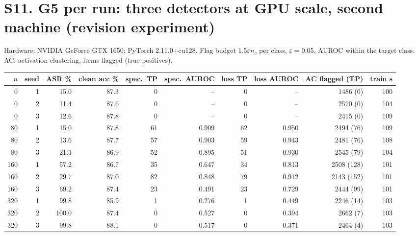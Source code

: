 \documentclass[10pt,a4paper]{article}
\begin{document}
\section{S11. G5 per run: three detectors at GPU scale, second machine (revision experiment)}
Hardware: NVIDIA GeForce GTX 1650; PyTorch 2.11.0+cu128. Flag budget $1.5\varepsilon n_c$ per class, $\varepsilon=0.05$. AUROC within the target class. AC: activation clustering, items flagged (true positives).
\small\begin{longtable}{rrrrrrrrrr}\toprule $n$ & seed & ASR \% & clean acc \% & spec.\ TP & spec.\ AUROC & loss TP & loss AUROC & AC flagged (TP) & train s\\\midrule
0 & 1 & 15.0 & 87.3 & 0 & -- & 0 & -- & 1486 (0) & 100\\
0 & 2 & 11.4 & 87.6 & 0 & -- & 0 & -- & 2570 (0) & 104\\
0 & 3 & 12.6 & 87.8 & 0 & -- & 0 & -- & 2415 (0) & 109\\
80 & 1 & 15.0 & 87.8 & 61 & 0.909 & 62 & 0.950 & 2494 (76) & 109\\
80 & 2 & 13.6 & 87.7 & 57 & 0.903 & 59 & 0.943 & 2481 (76) & 108\\
80 & 3 & 21.3 & 86.9 & 52 & 0.895 & 51 & 0.930 & 2545 (79) & 104\\
160 & 1 & 57.2 & 86.7 & 35 & 0.647 & 34 & 0.813 & 2508 (128) & 101\\
160 & 2 & 29.7 & 87.0 & 82 & 0.848 & 79 & 0.912 & 2143 (152) & 101\\
160 & 3 & 69.2 & 87.4 & 23 & 0.491 & 23 & 0.729 & 2444 (99) & 101\\
320 & 1 & 99.8 & 85.9 & 1 & 0.276 & 1 & 0.449 & 2246 (14) & 103\\
320 & 2 & 100.0 & 87.4 & 0 & 0.527 & 0 & 0.394 & 2662 (7) & 103\\
320 & 3 & 99.8 & 88.1 & 0 & 0.517 & 0 & 0.371 & 2464 (4) & 103\\
\bottomrule\end{longtable}\normalsize
\end{document}
